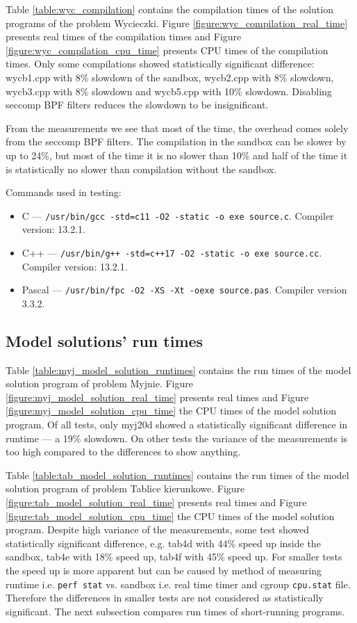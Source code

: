 \documentclass[en]{pracamgr}
\begin{document}
Table \ref{table:wyc_compilation} contains the compilation times of the solution programs of the problem Wycieczki. Figure \ref{figure:wyc_compilation_real_time} presents real times of the compilation times and Figure \ref{figure:wyc_compilation_cpu_time} presents CPU times of the compilation times. Only some compilations showed statistically significant difference: wycb1.cpp with 8\% slowdown of the sandbox, wycb2.cpp with 8\% slowdown, wycb3.cpp with 8\% slowdown and wycb5.cpp with 10\% slowdown. Disabling seccomp BPF filters reduces the slowdown to be insignificant.

From the measurements we see that most of the time, the overhead comes solely from the seccomp BPF filters. The compilation in the sandbox can be slower by up to 24\%, but most of the time it is no slower than 10\% and half of the time it is statistically no slower than compilation without the sandbox.

Commands used in testing:
\begin{itemize}
    \item C --- \texttt{/usr/bin/gcc -std=c11 -O2 -static -o exe source.c}. Compiler version: 13.2.1.
    \item C++ --- \texttt{/usr/bin/g++ -std=c++17 -O2 -static -o exe source.cc}. Compiler version: 13.2.1.
    \item Pascal --- \texttt{/usr/bin/fpc -O2 -XS -Xt -oexe source.pas}. Compiler version 3.3.2.
\end{itemize}

\subsection{Model solutions' run times}

Table \ref{table:myj_model_solution_runtimes} contains the run times of the model solution program of problem Myjnie. Figure \ref{figure:myj_model_solution_real_time} presents real times and Figure \ref{figure:myj_model_solution_cpu_time} the CPU times of the model solution program. Of all tests, only myj20d showed a statistically significant difference in runtime --- a 19\% slowdown. On other tests the variance of the measurements is too high compared to the differences to show anything.

Table \ref{table:tab_model_solution_runtimes} contains the run times of the model solution program of problem Tablice kierunkowe. Figure \ref{figure:tab_model_solution_real_time} presents real times and Figure \ref{figure:tab_model_solution_cpu_time} the CPU times of the model solution program. Despite high variance of the measurements, some test showed statistically significant difference, e.g. tab4d with 44\% speed up inside the sandbox, tab4e with 18\% speed up, tab4f with 45\% speed up. For smaller tests the speed up is more apparent but can be caused by method of measuring runtime i.e. \texttt{perf stat} vs. sandbox i.e. real time timer and cgroup \texttt{cpu.stat} file. Therefore the differences in smaller tests are not considered as statistically significant. The next subsection compares run times of short-running programs.
\end{document}
